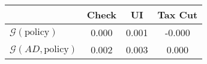 \begin{tabular}{@{}lccc@{}} 
\toprule 
                          & Check      & UI    & Tax Cut    \\  \midrule 
$\mathcal{G}(\text{policy})$ & 0.000  & 0.001  & -0.000     \\ 
$\mathcal{G}(AD,\text{policy})$ & 0.002  & 0.003  & 0.000     \\ 
\end{tabular}  
